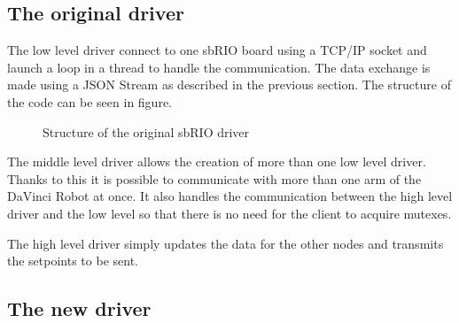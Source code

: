\subsection{The original driver}
The low level driver connect to one sbRIO board using a TCP/IP socket and launch a loop in a thread to handle the communication. The data exchange is made using a JSON Stream as described in the previous section. The structure of the code can be seen in figure.

\begin{figure}[H]
\centering
{}
\caption{Structure of the original sbRIO driver}
\label{original_driver}
\end{figure}

The middle level driver allows the creation of more than one low level driver. Thanks to this it is possible to communicate with more than one arm of the DaVinci Robot at once. It also handles the communication between the high level driver and the low level so that there is no need for the client to acquire mutexes.

The high level driver simply updates the data for the other nodes and transmits the setpoints to be sent.


\subsection{The new driver}

